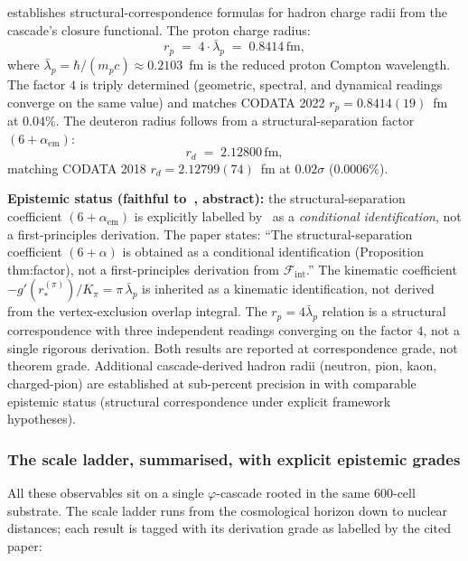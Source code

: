 \documentclass[11pt]{article}
\theoremstyle{plain}
\theoremstyle{definition}
\theoremstyle{remark}
\newcommand{\Fcal}{\mathcal{F}}
\begin{document}
\citet{SmartXXXII} establishes structural-correspondence formulas for hadron charge radii from the cascade's closure functional. The proton charge radius:
\begin{equation}\label{eq:r_p}
  r_p \;=\; 4 \cdot \bar\lambda_p \;=\; 0.8414\,\text{fm},
\end{equation}
where $\bar\lambda_p = \hbar/(m_p c) \approx 0.2103$~fm is the reduced proton Compton wavelength. The factor $4$ is triply determined (geometric, spectral, and dynamical readings converge on the same value) and matches CODATA 2022 $r_p = 0.8414(19)$~fm at $0.04\%$. The deuteron radius follows from a structural-separation factor $(6 + \alpha_\mathrm{em})$:
\begin{equation}\label{eq:r_d}
  r_d \;=\; 2.12800\,\text{fm},
\end{equation}
matching CODATA 2018 $r_d = 2.12799(74)$~fm at $0.02\sigma$ ($0.0006\%$).

\textbf{Epistemic status (faithful to~\citealp{SmartXXXII}, abstract):} the structural-separation coefficient $(6 + \alpha_\mathrm{em})$ is explicitly labelled by~\citet{SmartXXXII} as a \emph{conditional identification}, not a first-principles derivation. The paper states: ``The structural-separation coefficient $(6+\alpha)$ is obtained as a conditional identification (Proposition thm:factor), not a first-principles derivation from $\Fcal_\mathrm{int}$.'' The kinematic coefficient $-g'(r_*^{(\pi)})/K_\pi = \pi\,\bar\lambda_p$ is inherited as a kinematic identification, not derived from the vertex-exclusion overlap integral. The $r_p = 4\bar\lambda_p$ relation is a structural correspondence with three independent readings converging on the factor $4$, not a single rigorous derivation. Both results are reported at correspondence grade, not theorem grade. Additional cascade-derived hadron radii (neutron, pion, kaon, charged-pion) are established at sub-percent precision in \citet{SmartXXXII} with comparable epistemic status (structural correspondence under explicit framework hypotheses).

\subsubsection{The scale ladder, summarised, with explicit epistemic grades}

All these observables sit on a single $\varphi$-cascade rooted in the same 600-cell substrate. The scale ladder runs from the cosmological horizon down to nuclear distances; each result is tagged with its derivation grade as labelled by the cited paper:
\end{document}
